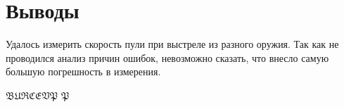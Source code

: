 \section{Выводы}

Удалось измерить скорость пули при выстреле из разного оружия.
Так как не проводился анализ причин ошибок, невозможно
сказать, что внесло самую большую погрешность в измерения.

$\mathfrak{BURCEVP}$ $\mathfrak{P}$
